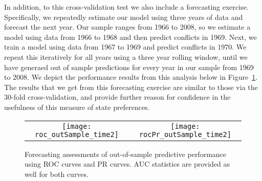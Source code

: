 In addition, to this cross-validation test we also include a forecasting exercise. Specifically, we repeatedly estimate our model using three years of data and forecast the next year. Our sample ranges from 1966 to 2008, so we estimate a model using data from 1966 to 1968 and then predict conflicts in 1969. Next, we train a model using data from 1967 to 1969 and predict conflicts in 1970. We repeat this iteratively for all years using a three year rolling window, until we have generaed out of sample predictions for every year in our sample from 1969 to 2008. We depict the performance results from this analysis below in Figure~\ref{fig:rocTime}. The results that we get from this forecasting exercise are similar to those via the 30-fold cross-validation, and provide further reason for confidence in the usefulness of this measure of state preferences.

\begin{figure}[ht]
	\centering
	\begin{tabular}{cc}
	\texttt{[image: roc\_outSample\_time2]} &
	\texttt{[image: rocPr\_outSample\_time2]}
	\end{tabular}
	\caption{Forecasting assessments of out-of-sample predictive performance using ROC curves and PR curves. AUC statistics are provided as well for both curves.}
	\label{fig:rocTime}
\end{figure}
\FloatBarrier
